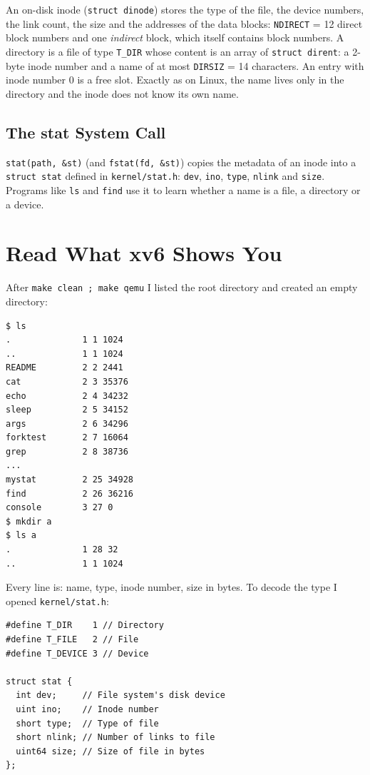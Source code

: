 \documentclass[12pt,a4paper]{article}
\begin{document}
An on-disk inode (\texttt{struct dinode}) stores the type of the file, the device numbers, the link count, the size and the addresses of the data blocks: \texttt{NDIRECT} = 12 direct block numbers and one \textit{indirect} block, which itself contains block numbers. A directory is a file of type \texttt{T\_DIR} whose content is an array of \texttt{struct dirent}: a 2-byte inode number and a name of at most \texttt{DIRSIZ} = 14 characters. An entry with inode number 0 is a free slot. Exactly as on Linux, the name lives only in the directory and the inode does not know its own name.

\subsection{The stat System Call}

\texttt{stat(path, \&st)} (and \texttt{fstat(fd, \&st)}) copies the metadata of an inode into a \texttt{struct stat} defined in \texttt{kernel/stat.h}: \texttt{dev}, \texttt{ino}, \texttt{type}, \texttt{nlink} and \texttt{size}. Programs like \texttt{ls} and \texttt{find} use it to learn whether a name is a file, a directory or a device.

\newpage
\section{Read What xv6 Shows You}

After \texttt{make clean ; make qemu} I listed the root directory and created an empty directory:

\begin{lstlisting}[style=terminal,caption={The root directory of xv6 and a new empty directory}]
$ ls
.              1 1 1024
..             1 1 1024
README         2 2 2441
cat            2 3 35376
echo           2 4 34232
sleep          2 5 34152
args           2 6 34296
forktest       2 7 16064
grep           2 8 38736
...
mystat         2 25 34928
find           2 26 36216
console        3 27 0
$ mkdir a
$ ls a
.              1 28 32
..             1 1 1024
\end{lstlisting}

Every line is: name, type, inode number, size in bytes. To decode the type I opened \texttt{kernel/stat.h}:

\begin{lstlisting}[style=code,caption={kernel/stat.h}]
#define T_DIR    1 // Directory
#define T_FILE   2 // File
#define T_DEVICE 3 // Device

struct stat {
  int dev;     // File system's disk device
  uint ino;    // Inode number
  short type;  // Type of file
  short nlink; // Number of links to file
  uint64 size; // Size of file in bytes
};
\end{lstlisting}
\end{document}
